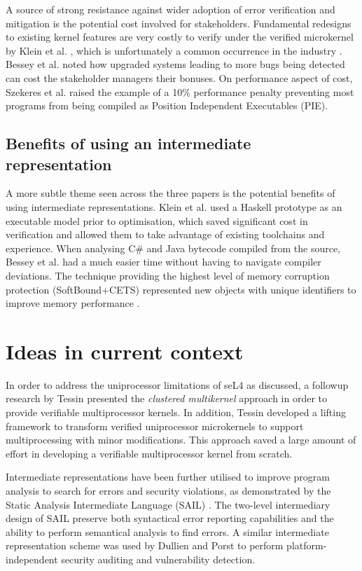 \documentclass[11pt]{article}
\begin{document}
A source of strong resistance against wider adoption of error verification and mitigation is the potential cost involved for stakeholders. Fundamental redesigns to existing kernel features are very costly to verify under the verified microkernel by Klein et al. \cite[5.3]{klein2009sel4}, which is unfortunately a common occurrence in the industry \cite{israeli2010linux}. Bessey et al. \cite[p. 73]{bessey2010few} noted how upgraded systems leading to more bugs being detected can cost the stakeholder managers their bonuses. On performance aspect of cost, Szekeres et al. \cite[V-A]{szekeres2013sok} raised the example of a 10\% performance penalty preventing most programs from being compiled as Position Independent Executables (PIE).

\subsection{Benefits of using an intermediate representation}

A more subtle theme seen across the three papers is the potential benefits of using intermediate representations. Klein et al. \cite[2.2, 5.2]{klein2009sel4} used a Haskell prototype as an executable model prior to optimisation, which saved significant cost in verification and allowed them to take advantage of existing toolchains and experience. When analysing C\# and Java bytecode compiled from the source, Bessey et al. \cite[p. 72]{bessey2010few} had a much easier time without having to navigate compiler deviations. The technique providing the highest level of memory corruption protection (SoftBound+CETS) represented new objects with unique identifiers to improve memory performance \cite[VI-C]{szekeres2013sok}. 

\section{Ideas in current context}

In order to address the uniprocessor limitations of seL4 as discussed, a followup research by Tessin \cite{von2012clustered} presented the \emph{clustered multikernel} approach in order to provide verifiable multiprocessor kernels. In addition, Tessin developed a lifting framework to transform verified uniprocessor microkernels to support multiprocessing with minor modifications. This approach saved a large amount of effort in developing a verifiable multiprocessor kernel from scratch.

Intermediate representations have been further utilised to improve program analysis to search for errors and security violations, as demonstrated by the Static Analysis Intermediate Language (SAIL) \cite{dillig2009sail}. The two-level intermediary design of SAIL preserve both syntactical error reporting capabilities and the ability to perform semantical analysis to find errors. A similar intermediate representation scheme was used by Dullien and Porst \cite{dullien2009reil} to perform platform-independent security auditing and vulnerability detection.
\end{document}
